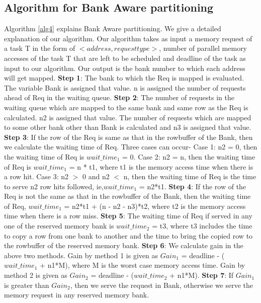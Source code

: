 \subsection{Algorithm for Bank Aware partitioning}\label{bafm}
Algorithm \ref{alg4} explains Bank Aware partitioning. We give a detailed explanation of our algorithm. Our algorithm takes
as input a memory request of a task T in the form of $<address, request type>$, number of parallel memory accesses of the task 
T that are left to be scheduled and deadline of the task as input to our algorithm. Our output is the bank number to which each address will get mapped. 
\newline
\newline
{\bf Step 1}: The bank to which the Req is mapped is evaluated. The variable Bank is assigned that value. n is 
assigned the number of requests ahead of Req in the waiting queue.
\newline
{\bf Step 2}: The number of requests in the waiting queue which are mapped to the same bank and same row as the Req is 
calculated. n2 is assigned that value. The number of requests which are mapped to some other bank other than Bank is calculated 
and n3 is assigned that value.
\newline
{\bf Step 3}: If the row of the Req is same as that in the rowbuffer of the Bank, then we calculate the waiting time of Req.
Three cases can occur-
\newline
Case 1: n2 = 0, then the waiting time of Req is $wait\_time_{1}$ =  0.
\newline
Case 2: n2 = n, then the waiting time of Req is $wait\_time_{1}$ = n * t1, where t1 is the memory access time when there is a row hit.
\newline
Case 3: n2 $>$ 0 and n2 $<$ n, then the waiting time of Req is the time to serve n2 row hits followed, ie,$wait\_time_{1}$ =
n2*t1. 
\newline
{\bf Step 4}: If the row of the Req is not the same as that in the rowbuffer of the Bank, then the waiting time 
of Req, $wait\_time_{1}$ = n2*t1 + (n - n2 - n3)*t2, where t2 is the memory access time when there is a row miss.
\newline
{\bf Step 5}: The waiting time of Req if served in any one of the reserved memory bank is $wait\_time_{2}$ = t3, where t3 includes the time to 
copy a row from one bank to another and the time to bring the copied row to the rowbuffer of the reserved memory bank.
\newline 
{\bf Step 6}: We calculate gain in the above two methods. Gain by method 1 is given as $Gain_{1}$ = deadline - ($wait\_time_{1}$ 
+ n1*M), where M is the worst case memory access time. Gain by method 2 is given as $Gain_{2}$ = deadline - ($wait\_time_{2}$ 
+ n1*M). 
\newline
{\bf Step 7}: If $Gain_{1}$ is greater than $Gain_{2}$, then we serve the request in Bank, otherwise we serve the memory 
request in any reserved memory bank.




